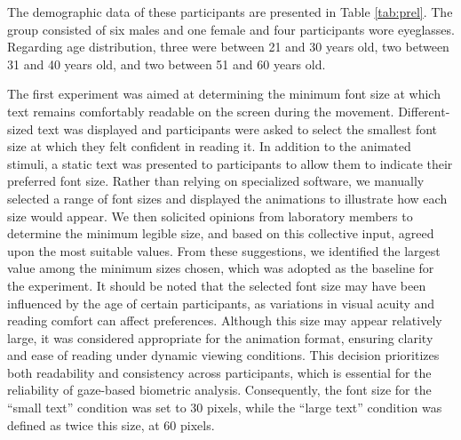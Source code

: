 \documentclass[12pt]{report}
\begin{document}
The demographic data of these participants are presented in Table \ref{tab:prel}. 
The group consisted of six males and one female and four participants wore eyeglasses. 
Regarding age distribution, three were between 21 and 30 years old, two between 31 and 40 years old, and two between 51 and 60 years old.

The first experiment was aimed at determining the minimum font size at which text remains comfortably readable on the screen during the movement. 
Different-sized text was displayed and participants were asked to select the smallest font size at which they felt confident in reading it. 
In addition to the animated stimuli, a static text was presented to participants to allow them to indicate their preferred font size. 
Rather than relying on specialized software, we manually selected a range of font sizes and displayed the animations to illustrate how each size would appear.
We then solicited opinions from laboratory members to determine the minimum legible size, and based on this collective input, agreed upon the most suitable values.
From these suggestions, we identified the largest value among the minimum sizes chosen, which was adopted as the baseline for the experiment. 
It should be noted that the selected font size may have been influenced by the age of certain participants, as variations in visual acuity and reading comfort can affect preferences. 
Although this size may appear relatively large, it was considered appropriate for the animation format, ensuring clarity and ease of reading under dynamic viewing conditions. 
This decision prioritizes both readability and consistency across participants, which is essential for the reliability of gaze-based biometric analysis. 
Consequently, the font size for the “small text” condition was set to 30 pixels, while the “large text” condition was defined as twice this size, at 60 pixels.
\end{document}

